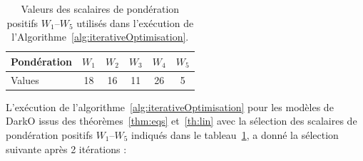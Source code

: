 \begin{table}
    \centering
    \begin{tabular}{|l|c|c|c|c|c|} 
    \hline
    Pondération & $W_1$ & $W_2$ & $W_3$ & $W_4$ & $W_5$ \\ \hline
    Values &18 & 16 & 11 & 26 & 5 \\ \hline
    \end{tabular}
    \label{tab:W1-W5}
    \caption{Valeurs des scalaires de pondération positifs $W_1$--$W_5$ utilisés dans l'exécution de l'Algorithme~\ref{alg:iterativeOptimisation}.}
\end{table}
L'exécution de l'algorithme~\ref{alg:iterativeOptimisation} pour les modèles de DarkO issus des théorèmes~\ref{thm:eqs} et~\ref{th:lin} avec la sélection des scalaires de pondération positifs $W_1$--$W_5$ indiqués dans le tableau~\ref{tab:W1-W5}, a donné la sélection suivante après 2 itérations :
